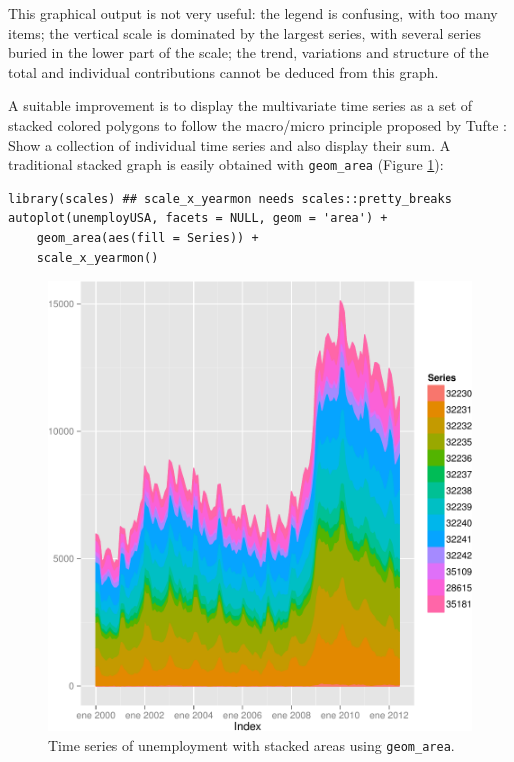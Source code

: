 This graphical output is not very useful: the legend is confusing,
with too many items; the vertical scale is dominated by the largest
series, with several series buried in the lower part of the scale; the
trend, variations and structure of the total and individual
contributions cannot be deduced from this graph.

A suitable improvement is to display the multivariate time series as a
set of stacked colored polygons to follow the macro/micro principle
proposed by Tufte \cite{Tufte1990}: Show a collection of individual
time series and also display their sum. A traditional stacked graph is
easily obtained with \texttt{geom\_area} (Figure \ref{fig:unemployUSAgeomArea}):

\lstset{language=r,label= ,caption= ,captionpos=b,numbers=none}
\begin{lstlisting}
library(scales) ## scale_x_yearmon needs scales::pretty_breaks
autoplot(unemployUSA, facets = NULL, geom = 'area') +
    geom_area(aes(fill = Series)) +
    scale_x_yearmon()  
\end{lstlisting}

\begin{figure}[htbp]
\centering
\includegraphics[width=.9\linewidth]{figs/unemployUSAgeomArea.pdf}
\caption{Time series of unemployment with stacked areas using \texttt{geom\_area}. \label{fig:unemployUSAgeomArea}}
\end{figure}

